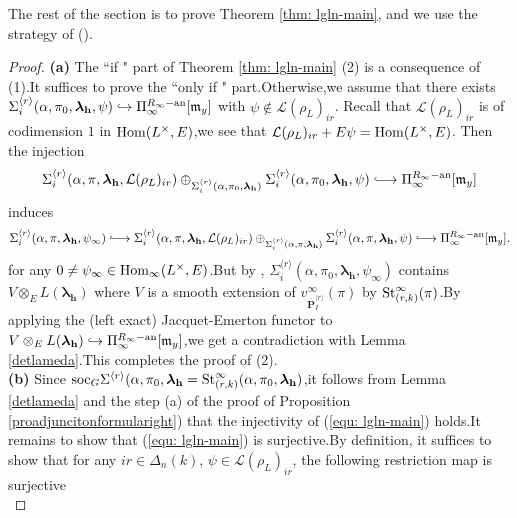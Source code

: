 \documentclass[SecEq,CM,GP]{degruyter-crelle} %
\theoremstyle{plain}
\newcommand{\hooklongrightarrow}{\lhook\joinrel\longrightarrow}
\newcommand{\ana}{{\rm an}}
\newcommand{\homo}{{\rm Hom}}
\newcommand{\lrr}{{\langle r\rangle}}
\newcommand{\op}{{\overline{{\mathbf{P}}}}}
\newcommand{\st}{{\rm St}}
\newcommand{\soc}{{\rm soc}}
\newcommand{\bh}{{\mathbf{h}}}
\newcommand{\fm}{{\mathfrak{m}}}
\newcommand{\sL}{\mathcal L}
\begin{document}
\noindent The rest of the section is to prove Theorem \ref{thm: lgln-main}, and we use the strategy of (\cite{2019DINGSimple}).\;\\
\begin{proof}
\textbf{(a)} The ``if " part  of Theorem \ref{thm: lgln-main} (2) is a consequence of (1).\;It suffices to prove the ``only if " part.\;Otherwise,\;we assume that there exists $\Sigma_{i}^{\lrr}(\alpha,\pi_0,{\bm\lambda}_\bh, \psi)\hookrightarrow \Pi_{\infty}^{R_{\infty}-\ana}[\fm_y]$ with $\psi\notin \sL(\rho_L)_{ir}$. Recall that $\sL(\rho_L)_{ir}$ is of codimension $1$ in $\homo(L^{\times}, E)$,\;we see that  $\sL(\rho_L)_{ir}+ E\psi =\homo(L^{\times}, E)$. Then the injection
\begin{equation*}
	\Sigma_i^{\lrr}(\alpha, \pi,{\bm\lambda}_\bh, \sL(\rho_L)_{ir})\oplus_{\Sigma_i^{\lrr}(\alpha,\pi_0,{\bm\lambda}_\bh)} \Sigma_{i}^{\lrr}(\alpha,\pi_0,{\bm\lambda}_\bh, \psi) \hooklongrightarrow \Pi_{\infty}^{R_{\infty}-\ana}[\fm_y]
\end{equation*}
induces
\begin{equation*}
	\Sigma_i^{\lrr}(\alpha, \pi,{\bm\lambda}_\bh, \psi_{\infty}) \hooklongrightarrow\Sigma_i^{\lrr}(\alpha, \pi,{\bm\lambda}_\bh, \sL(\rho_L)_{ir})\oplus_{\Sigma_i^{\lrr}(\alpha, \pi,{\bm\lambda}_\bh)} \Sigma_{i}^{\lrr}(\alpha, \pi,{\bm\lambda}_\bh, \psi) \hooklongrightarrow \Pi_{\infty}^{R_{\infty}-\ana}[\fm_y].
\end{equation*}
for any $0\neq \psi_{\infty}\in \homo_{\infty}(L^{\times},E)$.\;But by \cite[Remark 5.21]{2022ext1hyq}, $\Sigma_i^{\lrr}(\alpha,\pi_0,{\bm\lambda}_\bh, \psi_{\infty})$ contains $V\otimes_E L({\bm\lambda}_\bh)$ where $V$ is a smooth extension of $v_{\op^{\lrr}_I}^{\infty}(\pi)$ by $\st_{(r,k)}^{\infty}(\pi)$.\;By applying the (left exact) Jacquet-Emerton functor to $V\otimes_E L({\bm\lambda}_\bh)\hookrightarrow \Pi_{\infty}^{R_{\infty}-\ana}[\fm_y]$,\;we get a contradiction with Lemma \ref{detlameda}.\;This completes the proof of (2).\;
\\
\noindent \textbf{(b)} Since $\soc_{G} \Sigma^{\lrr}(\alpha,\pi_0,{\bm\lambda}_\bh=\st_{(r,k)}^{\infty}(\alpha,\pi_0,{\bm\lambda}_\bh)$,\;it follows from Lemma \ref{detlameda} and the step (a) of the proof of Proposition \ref{proadjuncitonformularight}) that the injectivity of (\ref{equ: lgln-main}) holds.\;It remains  to  show that (\ref{equ: lgln-main}) is surjective.\;By definition, it suffices to show that for any $ir\in \Delta_n(k)$, $\psi\in \sL(\rho_L)_{ir}$, the following restriction map is surjective
\begin{equation}\label{equ: lgln-rest}

\end{equation}
\end{proof}
\end{document}
